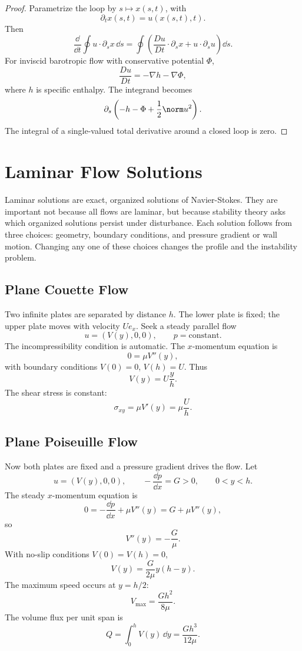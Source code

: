 \begin{proof}
Parametrize the loop by \(s\mapsto x(s,t)\), with
\[
  \partial_t x(s,t)=u(x(s,t),t).
\]
Then
\[
  \frac{\dd}{\dd t}\oint u\cdot \partial_sx\,\dd s
  =
  \oint
  \left(
    \frac{D u}{D t}\cdot \partial_sx
    +
    u\cdot\partial_su
  \right)\dd s.
\]
For inviscid barotropic flow with conservative potential \(\Phi\),
\[
  \frac{D u}{D t}=-\nabla h-\nabla\Phi,
\]
where \(h\) is specific enthalpy. The integrand becomes
\[
  \partial_s\left(
    -h-\Phi+\frac12\norm u^2
  \right).
\]
The integral of a single-valued total derivative around a closed loop is zero.
\end{proof}

\section{Laminar Flow Solutions}
\label{sec:laminar-solutions}

Laminar solutions are exact, organized solutions of Navier-Stokes. They are
important not because all flows are laminar, but because stability theory asks
which organized solutions persist under disturbance.
Each solution follows from three choices: geometry, boundary conditions, and
pressure gradient or wall motion. Changing any one of these choices changes the
profile and the instability problem.

\subsection{Plane Couette Flow}
\label{subsec:plane-couette}

Two infinite plates are separated by distance \(h\). The lower plate is fixed;
the upper plate moves with velocity \(Ue_x\). Seek a steady parallel flow
\[
  u=(V(y),0,0),\qquad p=\text{constant}.
\]
The incompressibility condition is automatic. The \(x\)-momentum equation is
\[
  0=\mu V''(y),
\]
with boundary conditions \(V(0)=0\), \(V(h)=U\). Thus
\[
  \boxed{V(y)=U\frac{y}{h}.}
\]
The shear stress is constant:
\[
  \sigma_{xy}=\mu V'(y)=\mu\frac{U}{h}.
\]

\subsection{Plane Poiseuille Flow}
\label{subsec:plane-poiseuille}

Now both plates are fixed and a pressure gradient drives the flow. Let
\[
  u=(V(y),0,0),
  \qquad
  -\frac{\dd p}{\dd x}=G>0,
  \qquad
  0<y<h.
\]
The steady \(x\)-momentum equation is
\[
  0=-\frac{\dd p}{\dd x}+\mu V''(y)=G+\mu V''(y),
\]
so
\[
  V''(y)=-\frac{G}{\mu}.
\]
With no-slip conditions \(V(0)=V(h)=0\),
\[
  \boxed{
  V(y)=\frac{G}{2\mu}y(h-y).
  }
\]
The maximum speed occurs at \(y=h/2\):
\[
  V_{\max}=\frac{Gh^2}{8\mu}.
\]
The volume flux per unit span is
\[
  Q=\int_0^h V(y)\,\dd y
  =
  \frac{Gh^3}{12\mu}.
\]

